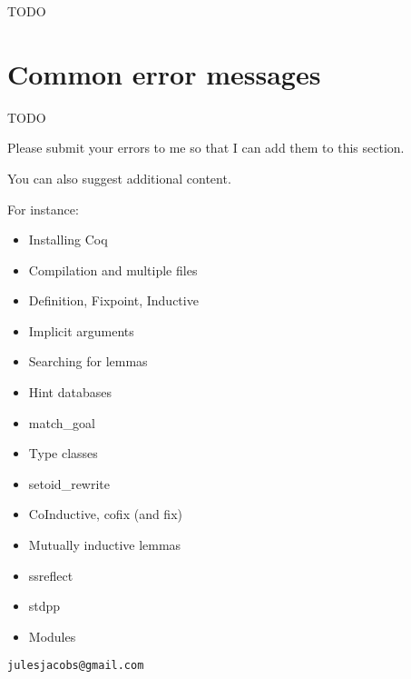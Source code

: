 TODO

\section{Common error messages}

TODO

Please submit your errors to me so that I can add them to this section.

You can also suggest additional content.

For instance:

\begin{itemize}
  \item Installing Coq
  \item Compilation and multiple files
  \item Definition, Fixpoint, Inductive
  \item Implicit arguments
  \item Searching for lemmas
  \item Hint databases
  \item match\_goal
  \item Type classes
  \item setoid\_rewrite
  \item CoInductive, cofix (and fix)
  \item Mutually inductive lemmas
  \item ssreflect
  \item stdpp
  \item Modules
\end{itemize}

\texttt{julesjacobs@gmail.com}







